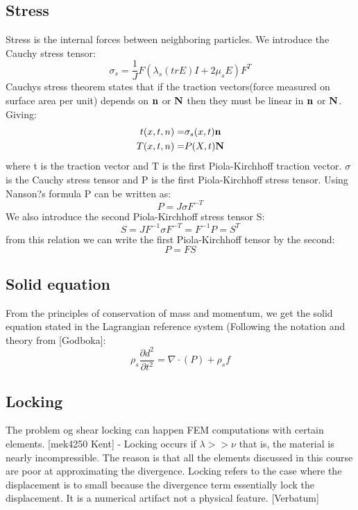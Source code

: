 \subsection*{Stress}
Stress is the internal forces between neighboring particles. We introduce the Cauchy stress tensor:
$$ \sigma_s = \frac{1}{J} F(\lambda_s (tr E)I + 2\mu_sE) F^T$$
Cauchys stress theorem states that if the traction vectors(force measured on surface area per unit) depends on $\bold{n}$ or $\bold{N}$ then they must be linear in $\bold{n}$ or $\bold{N}$. Giving: 
\begin{align*}
t(x,t,n) =& \sigma_s(x,t) \bold{n} \\
T(x,t,n) =& P(X,t) \bold{N} \\
\end{align*}
where t is the traction vector and T is the first Piola-Kirchhoff traction vector. $\sigma$ is the Cauchy stress tensor and P is the first Piola-Kirchhoff stress tensor. Using Nanson?s formula P can be written as:
$$ P = J \sigma F^{-T} $$
We also introduce the second Piola-Kirchhoff stress tensor S:
$$ S = J F^{-1}\sigma F^{-T} = F^{-1} P = S^T $$
from this relation we can write the first Piola-Kirchhoff tensor by the second:
$$ P = FS$$

\subsection*{Solid equation}
From the principles of conservation of mass and momentum, we get the solid equation stated in the Lagrangian reference system (Following the notation and theory from [Godboka]:
\begin{equation}
\rho_s \frac{\partial d^2}{\partial t^2} = \nabla \cdot ( P ) + \rho_s f 
\end{equation}

\subsection*{Locking}
The problem og shear locking can happen FEM computations with certain elements. 
[mek4250 Kent] - Locking occurs if  $ \lambda >> \nu $ that is, the material is nearly incompressible. The reason is that all the elements discussed in this course are poor at approximating the divergence. Locking refers to the case where the displacement is to small because the divergence term essentially lock the displacement. It is a numerical artifact not a physical feature. [Verbatum]






